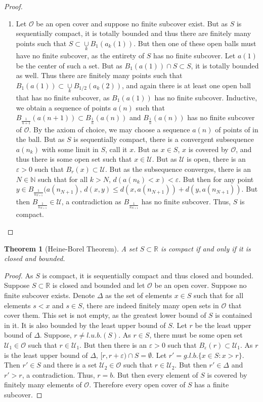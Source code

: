 \documentclass[oneside]{book}
\theoremstyle{mystyle}
\newtheorem{theorem}{Theorem}[section]
\begin{document}
\begin{proof}
\begin{enumerate}
\item Let $\mathcal{O}$ be an open cover and suppose no finite subcover exist. But as $S$ is sequentially compact, it is totally bounded and thus there are finitely many points such that $S\subset \underset{k}\cup B_{1}(a_k(1))$. But then one of these open balls must have no finite subcover, as the entirety of $S$ has no finite subcover. Let $a(1)$ be the center of such a set. But as $B_{1}(a(1))\cap S \subset S$, it is totally bounded as well. Thus there are finitely many points such that $B_{1}(a(1))\subset \underset{k}\cup B_{1/2}(a_k(2))$, and again there is at least one open ball that has no finite subcover, as $B_{1}(a(1))$ has no finite subcover. Inductive, we obtain a sequence of points $a(n)$ such that $B_{\frac{1}{n+1}}(a(n+1))\subset B_{\frac{1}{n}}(a(n))$ and $B_{\frac{1}{n}}(a(n))$ has no finite subcover of $\mathcal{O}$. By the axiom of choice, we may choose a sequence $a(n)$ of points of in the ball. But as $S$ is sequentially compact, there is a convergent subsequence $a(n_k)$ with some limit in $S$, call it $x$. But as $x\in S$, $x$ is covered by $\mathcal{O}$, and thus there is some open set such that $x\in \mathcal{U}$. But as $\mathcal{U}$ is open, there is an $\varepsilon>0$ such that $B_{r}(x)\subset \mathcal{U}$. But as the subsequence converges, there is an $N\in \mathbb{N}$ such that for all $k>N$, $d(a(n_k)<x) < \varepsilon$. But then for any point $y\in B_{\frac{1}{n_{N+1}}}(a(n_{N+1})$, $d(x,y) \leq d(x,a(n_{N+1}))+d(y,a(n_{N+1}))$. But then $B_{\frac{1}{n_{N+1}}}\in \mathcal{U}$, a contradiction as $B_{\frac{1}{n_{N+1}}}$ has no finite subcover. Thus, $S$ is compact. 
\end{enumerate}
\end{proof}

\begin{theorem}[Heine-Borel Theorem]
A set $S\subset \mathbb{R}$ is compact if and only if it is closed and bounded.
\end{theorem}
\begin{proof}
As $S$ is compact, it is sequentially compact and thus closed and bounded. Suppose $S\subset \mathbb{R}$ is closed and bounded and let $\mathcal{O}$ be an open cover. Suppose no finite subcover exists. Denote $\Delta$ as the set of elements $x\in S$ such that for all elements $s<x$ and $s\in S$, there are indeed finitely many open sets in $\mathcal{O}$ that cover them. This set is not empty, as the greatest lower bound of $S$ is contained in it. It is also bounded by the least upper bound of $S$. Let $r$ be the least upper bound of $\Delta$. Suppose, $r\ne l.u.b.(S)$. As $r\in S$, there must be some open set $\mathcal{U}_1\in \mathcal{O}$ such that $r\in \mathcal{U}_1$. But then there is an $\varepsilon>0$ such that $B_{\varepsilon}(r) \subset \mathcal{U}_1$. As $r$ is the least upper bound of $\Delta$, $[r,r+\varepsilon)\cap S = \emptyset$. Let $r' = g.l.b.\{x\in S: x>r\}$. Then $r'\in S$ and there is a set $\mathcal{U}_2 \in \mathcal{O}$ such that $r\in \mathcal{U}_2$. But then $r' \in \Delta$ and $r'>r$, a contradiction. Thus, $r=b$. But then every element of $S$ is covered by finitely many elements of $\mathcal{O}$. Therefore every open cover of $S$ has a finite subcover.
\end{proof}
\end{document}
